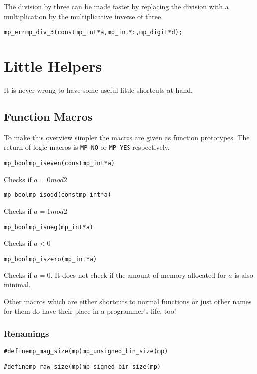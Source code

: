 \documentclass[synpaper]{book}
\begin{document}
The division by three can be made faster by replacing the division with a multiplication by the multiplicative inverse of three.

\begin{alltt}
mp_err mp_div_3(const mp_int *a, mp_int *c, mp_digit *d);
\end{alltt}

\chapter{Little Helpers}
It is never wrong to have some useful little shortcuts at hand.
\section{Function Macros}
To make this overview simpler the macros are given as function prototypes. The return of logic macros is \texttt{MP\_NO} or \texttt{MP\_YES} respectively.

\begin{alltt}
mp_bool mp_iseven(const mp_int *a)
\end{alltt}
Checks if $a = 0 mod 2$

\begin{alltt}
mp_bool mp_isodd(const mp_int *a)
\end{alltt}
Checks if $a = 1 mod 2$

\begin{alltt}
mp_bool mp_isneg(mp_int *a)
\end{alltt}
Checks if $a < 0$


\begin{alltt}
mp_bool mp_iszero(mp_int *a)
\end{alltt}
Checks if $a = 0$. It does not check if the amount of memory allocated for $a$ is also minimal.


Other macros which are either shortcuts to normal functions or just other names for them do have their place in a programmer's life, too!

\subsection{Renamings}
\begin{alltt}
#define mp_mag_size(mp) mp_unsigned_bin_size(mp)
\end{alltt}


\begin{alltt}
#define mp_raw_size(mp) mp_signed_bin_size(mp)
\end{alltt}
\end{document}
